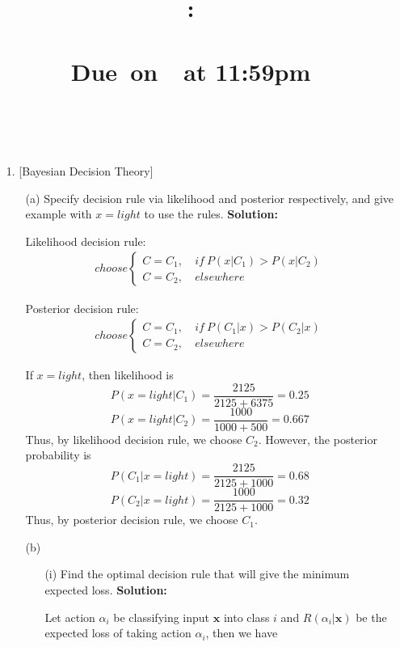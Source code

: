 \documentclass{article}
\title{
    \vspace{2in}
    \textmd{\textbf{\hmwkClass:\\ \hmwkTitle}}\\
    \normalsize\vspace{0.1in}\small{Due\ on\ \hmwkDueDate\ at 11:59pm}\\
    \vspace{0.1in}\large{\textit{\hmwkClassInstructor}}
    \vspace{3in}
}
\author{\textbf{\hmwkAuthorName}\\ \hmwkAuthorID}
\date{}
\renewcommand{\b}[1]{\bm{#1}}
\begin{document}
\maketitle
\pagebreak

\begin{enumerate}
    \setlength\parindent{2em}
    \item [1.] [Bayesian Decision Theory]
    \begin{enumerate}
        \setlength\parindent{2em}
        \item [(a)] Specify decision rule via likelihood and posterior respectively, and give example with $x=light$ to use the rules.\newline
        {\bf Solution:}
        \par Likelihood decision rule:
        \begin{align*}
            choose\left\{\begin{aligned}
                C=C_1,&\ if\ P(x|C_1) > P(x|C_2)\\
                C=C_2,&\ elsewhere
            \end{aligned}\right.
        \end{align*}
        \par Posterior decision rule:
        \begin{align*}
            choose\left\{\begin{aligned}
                C=C_1,&\ if\ P(C_1|x) > P(C_2|x)\\
                C=C_2,&\ elsewhere
            \end{aligned}\right.
        \end{align*}
        \par If $x=light$, then likelihood is 
        \[P(x=light|C_1)=\frac{2125}{2125+6375}=0.25\]
        \[P(x=light|C_2)=\frac{1000}{1000+500}=0.667\]
        Thus, by likelihood decision rule, we choose $C_2$.
        However, the posterior probability is
        \[P(C_1|x=light)=\frac{2125}{2125+1000}=0.68\]
        \[P(C_2|x=light)=\frac{1000}{2125+1000}=0.32\]
        Thus, by posterior decision rule, we choose $C_1$.
        \item [(b)]
        \begin{enumerate}
            \setlength\parindent{2em}
            \item [(i)] Find the optimal decision rule that will give the minimum expected loss.\newline
            {\bf Solution:}
            \par Let action $\alpha_i$ be classifying input $\b{x}$ into class $i$ and $R(\alpha_i|\b{x})$ be the expected loss of taking action $\alpha_i$, then we have

\end{enumerate}
\end{enumerate}
\end{enumerate}
\end{document}
